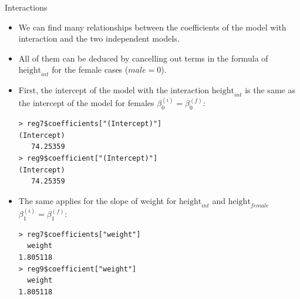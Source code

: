 \documentclass[handout]{beamer}
\begin{document}
\begin{frame}[fragile]{Interactions}
\scriptsize{ 
\begin{itemize}
\item We can find many relationships between the coefficients of the model with interaction  and the two independent models.

\item All of them can be deduced by cancelling out terms in the formula of $\text{height}_{int}$ for the female cases ($male=0$).


\item First, the intercept of the model with the interaction $\text{height}_{int}$ is the same as the intercept of the model for females  $\beta_0^{(i)}=\beta_0^{(f)}$:
\begin{verbatim}
> reg7$coefficients["(Intercept)"]
(Intercept) 
   74.25359 
> reg9$coefficient["(Intercept)"]
(Intercept) 
   74.25359  
\end{verbatim}

\item The same applies for the slope of weight for $\text{height}_{int}$  and  $\text{height}_{female}$    $\beta_1^{(i)}=\beta_1^{(f)}$:
\begin{verbatim}
> reg7$coefficients["weight"]
  weight 
1.805118 
> reg9$coefficient["weight"]
  weight 
1.805118 
\end{verbatim}

 
\end{itemize}





}
\end{frame}
\end{document}
